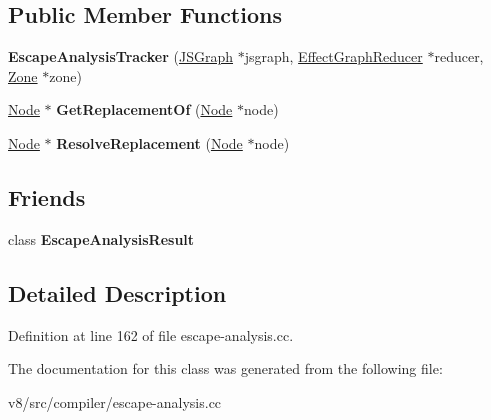 \subsection*{Public Member Functions}
\begin{DoxyCompactItemize}
\item 
\mbox{\label{classv8_1_1internal_1_1compiler_1_1EscapeAnalysisTracker_aff9b25b7f95081a05f6c6f98d76ab336}} 
{\bfseries Escape\+Analysis\+Tracker} (\mbox{\hyperlink{classv8_1_1internal_1_1compiler_1_1JSGraph}{J\+S\+Graph}} $\ast$jsgraph, \mbox{\hyperlink{classv8_1_1internal_1_1compiler_1_1EffectGraphReducer}{Effect\+Graph\+Reducer}} $\ast$reducer, \mbox{\hyperlink{classv8_1_1internal_1_1Zone}{Zone}} $\ast$zone)
\item 
\mbox{\label{classv8_1_1internal_1_1compiler_1_1EscapeAnalysisTracker_aa4f71330801af27881d22fbc4c511eae}} 
\mbox{\hyperlink{classv8_1_1internal_1_1compiler_1_1Node}{Node}} $\ast$ {\bfseries Get\+Replacement\+Of} (\mbox{\hyperlink{classv8_1_1internal_1_1compiler_1_1Node}{Node}} $\ast$node)
\item 
\mbox{\label{classv8_1_1internal_1_1compiler_1_1EscapeAnalysisTracker_a14261db737b40c8b58e806aa1d037838}} 
\mbox{\hyperlink{classv8_1_1internal_1_1compiler_1_1Node}{Node}} $\ast$ {\bfseries Resolve\+Replacement} (\mbox{\hyperlink{classv8_1_1internal_1_1compiler_1_1Node}{Node}} $\ast$node)
\end{DoxyCompactItemize}
\subsection*{Friends}
\begin{DoxyCompactItemize}
\item 
\mbox{\label{classv8_1_1internal_1_1compiler_1_1EscapeAnalysisTracker_a28f1f2e3a6689801850b91f089e45862}} 
class {\bfseries Escape\+Analysis\+Result}
\end{DoxyCompactItemize}


\subsection{Detailed Description}


Definition at line 162 of file escape-\/analysis.\+cc.



The documentation for this class was generated from the following file\+:\begin{DoxyCompactItemize}
\item 
v8/src/compiler/escape-\/analysis.\+cc\end{DoxyCompactItemize}
